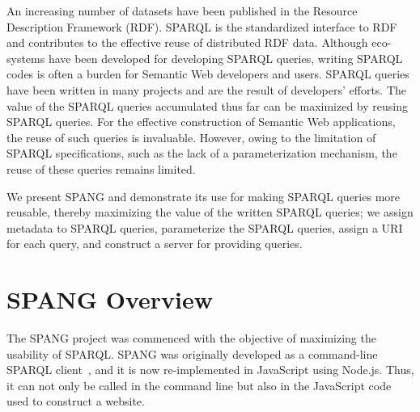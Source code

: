 \documentclass[runningheads]{llncs}
\begin{document}
An increasing number of datasets have been published in the Resource Description Framework (RDF).
SPARQL is the standardized interface to RDF and contributes to the effective reuse of distributed RDF data. 
Although eco-systems have been developed for developing SPARQL queries, writing SPARQL codes is often a burden for Semantic Web developers and users. 
SPARQL queries have been written in many projects and are the result of developers' efforts. 
The value of the SPARQL queries accumulated thus far can be maximized by reusing SPARQL queries.
For the effective construction of Semantic Web applications, the reuse of such queries is invaluable.
However, owing to the limitation of SPARQL specifications, such as the lack of a parameterization mechanism, the reuse of these queries remains limited. 


We present SPANG and demonstrate its use for making SPARQL queries more reusable, thereby maximizing the value of the written SPARQL queries;
we assign metadata to SPARQL queries,
parameterize the SPARQL queries,
assign a URI for each query, and
construct a server for providing queries.


\section{SPANG Overview}

The SPANG project was commenced with the objective of maximizing the usability of SPARQL. 
SPANG was originally developed as a command-line SPARQL client~\cite{spang}, and it is now re-implemented in JavaScript using Node.js. Thus, it can not only be called in the command line but also in the JavaScript code used to construct a website.
\end{document}
